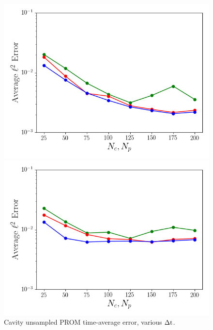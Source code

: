 \begin{figure}
	\begin{minipage}{0.49\linewidth}
		\includegraphics[width=0.99\linewidth]{Chapters/CavityAndCVRC/Images/cavity/unsampled/unsampled_dt5e-6_Average_errorRaw.png}
		\subcaption{\label{fig:cavityUnsampledROMErrVsModesDt5en6}$\dt = 5 \times \dtFOM$}
	\end{minipage}
	\begin{minipage}{0.49\linewidth}
		\includegraphics[width=0.99\linewidth]{Chapters/CavityAndCVRC/Images/cavity/unsampled/unsampled_dt1e-5_Average_errorRaw.png}
		\subcaption{$\dt = 10 \times \dtFOM$}
	\end{minipage}
	\caption{\label{fig:cavityUnsampledROMErrVsModes}Cavity unsampled PROM time-average error, various $\Delta \text{t}$.}
\end{figure}

